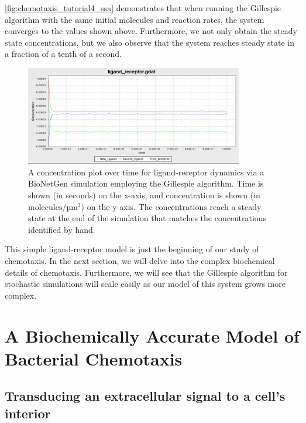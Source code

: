 \autoref{fig:chemotaxis_tutorial4_ssa} demonstrates that when running the Gillespie algorithm with the same initial molecules and reaction rates, the system converges to the values shown above. Furthermore, we not only obtain the steady state concentrations, but we also observe that the system reaches steady state in a fraction of a tenth of a second.\\

\begin{figure}[h]
\centering
\mySfFamily
\includegraphics[width = 0.85\textwidth]{../images/chemotaxis_tutorial4_ssa.png}
\caption{A concentration plot over time for ligand-receptor dynamics via a BioNetGen simulation employing the Gillespie algorithm. Time is shown (in seconds) on the x-axis, and concentration is shown (in $\text{molecules}/\text{µm}^\text{3}$) on the y-axis. The concentrations reach a steady state at the end of the simulation that matches the concentrations identified by hand.}
\label{fig:chemotaxis_tutorial4_ssa}
\end{figure}

This simple ligand-receptor model is just the beginning of our study of chemotaxis. In the next section, we will delve into the complex biochemical details of chemotaxis. Furthermore, we will see that the Gillespie algorithm for stochastic simulations will scale easily as our model of this system grows more complex.\\

\FloatBarrier
{}

\section{A Biochemically Accurate Model of Bacterial Chemotaxis}
\label{sec:a_biochemically_accurate_model_of_bacterial_chemotaxis}

\subsection{Transducing an extracellular signal to a cell's interior}

